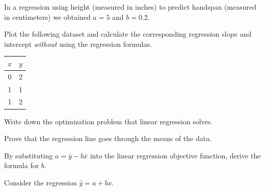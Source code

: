 \documentclass[addpoints,12pt]{exam}
\begin{document}
\begin{questions}

\question In a regression using height (measured in inches) to predict handspan (measured in centimeters) we obtained $a = 5$ and $b = 0.2$. 

\question Plot the following dataset and calculate the corresponding regression slope and intercept \emph{without} using the regression formulas.\\ 
\begin{tabular}[h]{cc}
  $x$ & $y$\\
  \hline
   0 & 2\\
   1 & 1\\
   1 & 2
\end{tabular}

\question Write down the optimization problem that linear regression solves.

\question Prove that the regression line goes through the means of the data.

\question By substituting $a = \bar{y} - b\bar{x}$ into the linear regression objective function, derive the formula for $b$.

\question Consider the regression $\widehat{y} = a + bx$.


\end{questions}
\end{document}

